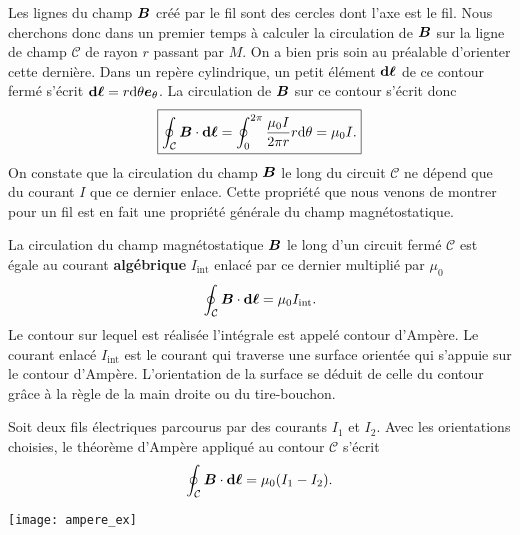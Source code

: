 Les lignes du champ $\vecb$ créé par le fil sont des cercles dont l'axe est le
fil. Nous cherchons donc dans un premier temps à calculer la circulation de $\vecb$ 
sur la ligne de champ $\mathcal{C}$ de rayon $r$ passant par $M$. 
On a bien pris soin au préalable
d'orienter cette dernière. Dans un repère cylindrique, un petit élément $\dl$ de ce 
contour fermé s'écrit $\dl = r \dtheta \etheta$. La circulation de $\vecb$ sur
ce contour s'écrit donc
\begin{equation*}
	\boxed{\displaystyle{\oint_\mathcal{C} \vecb \cdot \dl = 
		\oint_0^{2 \pi} \dfrac{\mu_0 I}{2 \pi r} r\dtheta
	= \mu_0 I.}}
\end{equation*}
On constate que la circulation du champ $\vecb$ le long du circuit $\mathcal{C}$
ne dépend que du courant $I$ que ce dernier enlace. Cette propriété que nous venons
de montrer pour un fil est en fait une propriété générale du champ magnétostatique.

\begin{defn}
	La circulation du champ magnétostatique $\vecb$ le long d'un circuit fermé
	$\mathcal{C}$ est égale au courant \textbf{algébrique} $I_\mathrm{int}$ 
	enlacé par ce dernier multiplié
	par $\mu_0$
	\begin{equation}
		\oint_\mathcal{C} \vecb \cdot \dl = \mu_0 I_\mathrm{int}.
	\end{equation}
	Le contour sur lequel est réalisée l'intégrale est appelé contour d'Ampère.
	Le courant enlacé $I_\mathrm{int}$ est le courant qui traverse une surface 
	orientée
	qui s'appuie sur le contour d'Ampère. L'orientation de la surface 
	se déduit de celle du contour
	grâce à la règle de la main droite ou du tire-bouchon.
\end{defn}

\begin{exemple}
	\begin{minipage}{0.6\linewidth}
	Soit deux fils électriques parcourus par des courants $I_1$ et $I_2$.
	Avec les orientations choisies, le théorème d'Ampère appliqué au 
	contour $\mathcal{C}$ s'écrit
	\begin{equation*}
		\oint_\mathcal{C} \vecb \cdot \dl = \mu_0(I_1 - I_2).
	\end{equation*}
	\end{minipage}
	\hfill
	\begin{minipage}{0.35\linewidth}
		\texttt{[image: ampere\_ex]}
	\end{minipage}

\end{exemple}

